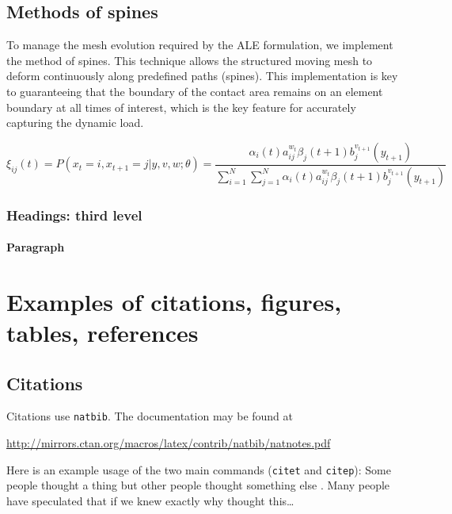 \documentclass{article}
\begin{document}
\subsection{Methods of spines}
To manage the mesh evolution required by the ALE formulation, we implement the method of spines. This technique allows the structured moving mesh to deform continuously along predefined paths (spines). This implementation is key to guaranteeing that the boundary of the contact area remains on an element boundary at all times of interest, which is the key feature for accurately capturing the dynamic load.

\lipsum[5]
\begin{equation}
	\xi _{ij}(t)=P(x_{t}=i,x_{t+1}=j|y,v,w;\theta)= {\frac {\alpha _{i}(t)a^{w_t}_{ij}\beta _{j}(t+1)b^{v_{t+1}}_{j}(y_{t+1})}{\sum _{i=1}^{N} \sum _{j=1}^{N} \alpha _{i}(t)a^{w_t}_{ij}\beta _{j}(t+1)b^{v_{t+1}}_{j}(y_{t+1})}}
\end{equation}

\subsubsection{Headings: third level}
\lipsum[6]

\paragraph{Paragraph}
\lipsum[7]



\section{Examples of citations, figures, tables, references}
\label{sec:others}

\subsection{Citations}
Citations use \verb+natbib+. The documentation may be found at
\begin{center}
	\url{http://mirrors.ctan.org/macros/latex/contrib/natbib/natnotes.pdf}
\end{center}

Here is an example usage of the two main commands (\verb+citet+ and \verb+citep+): Some people thought a thing \citep{kour2014real, hadash2018estimate} but other people thought something else \citep{kour2014fast}. Many people have speculated that if we knew exactly why \citet{kour2014fast} thought this\dots
\end{document}
